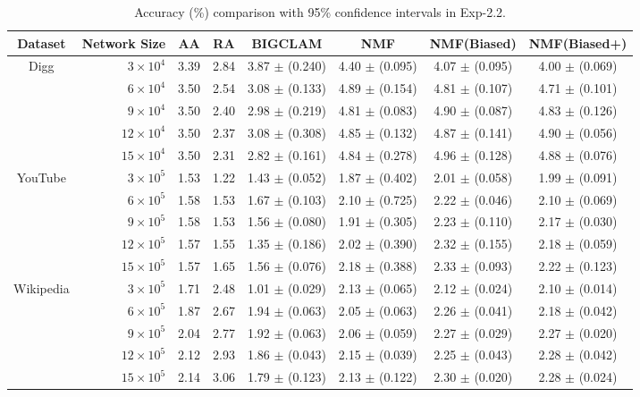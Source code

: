 \documentclass[10pt,journal,compsoc]{IEEEtran}
\newcommand{\NMF}{{\sf NMF}\xspace }
\newcommand{\Biased}{{\sf NMF(Biased)}\xspace}
\newcommand{\Aa}{{\sf AA}\xspace }
\newcommand{\RA}{{\sf RA}\xspace }
\newcommand{\BIGCLAM}{{\sf BIGCLAM}\xspace}
\newcommand{\Digg}{{\sf Digg}\xspace}
\newcommand{\YouTube}{{\sf YouTube}\xspace}
\newcommand{\Wikipedia}{{\sf Wikipedia}\xspace}
\newcommand{\Biasedp}{{\sf NMF(Biased+)}\xspace}
\begin{document}
\begin{table}
\caption{Accuracy (\%) comparison with 95\% confidence intervals in Exp-2.2.}
\label{tab_accuracy_4}
\vspace{-2ex}
\centering
\newcommand{\tabincell}[2]{\begin{tabular}{@{}#1@{}}#2\end{tabular}}
\begin{tabular}{c|r|c|c|c|c|c|c}
\hline \hline Dataset  & Network Size & \Aa & \RA & \BIGCLAM & \NMF & \Biased & \Biasedp  \\
\hline
\multirow{5}{*}{\Digg}
 & $3 \times 10^4 $ & 3.39 & 2.84 & 3.87 $\pm$ (0.240) & 4.40 $\pm$ (0.095) & 4.07 $\pm$ (0.095) & 4.00 $\pm$ (0.069) \\
 & $6 \times 10^4 $ & 3.50 & 2.54 & 3.08 $\pm$ (0.133) & 4.89 $\pm$ (0.154) & 4.81 $\pm$ (0.107) & 4.71 $\pm$ (0.101)  \\
 & $9 \times 10^4 $ & 3.50 & 2.40 & 2.98 $\pm$ (0.219) & 4.81 $\pm$ (0.083) & 4.90 $\pm$ (0.087) & 4.83 $\pm$ (0.126)  \\
 & $12 \times 10^4 $ & 3.50 & 2.37 & 3.08 $\pm$ (0.308) & 4.85 $\pm$ (0.132) & 4.87 $\pm$ (0.141) & 4.90 $\pm$ (0.056) \\
 & $15 \times 10^4 $ & 3.50 & 2.31 & 2.82 $\pm$ (0.161) & 4.84 $\pm$ (0.278) & 4.96 $\pm$ (0.128) & 4.88 $\pm$ (0.076)  \\
\hline
\multirow{5}{*}{\YouTube}
 & $3 \times 10^5 $ & 1.53 & 1.22 & 1.43 $\pm$ (0.052) & 1.87 $\pm$ (0.402) & 2.01 $\pm$ (0.058) & 1.99 $\pm$ (0.091)  \\
 & $6 \times 10^5 $ & 1.58 & 1.53 & 1.67 $\pm$ (0.103) & 2.10 $\pm$ (0.725) & 2.22 $\pm$ (0.046) & 2.10 $\pm$ (0.069)  \\
 & $9 \times 10^5 $ & 1.58 & 1.53 & 1.56 $\pm$ (0.080) & 1.91 $\pm$ (0.305) & 2.23 $\pm$ (0.110) & 2.17 $\pm$ (0.030)  \\
 & $12 \times 10^5 $ & 1.57 & 1.55 & 1.35 $\pm$ (0.186) & 2.02 $\pm$ (0.390) & 2.32 $\pm$ (0.155) & 2.18 $\pm$ (0.059)  \\
 & $15 \times 10^5 $ & 1.57 & 1.65 & 1.56 $\pm$ (0.076) & 2.18 $\pm$ (0.388) & 2.33 $\pm$ (0.093) & 2.22 $\pm$ (0.123)  \\
\hline
\multirow{5}{*}{\Wikipedia}
 & $3 \times 10^5 $ & 1.71 & 2.48 & 1.01 $\pm$ (0.029) & 2.13 $\pm$ (0.065) & 2.12 $\pm$ (0.024) & 2.10 $\pm$ (0.014)  \\
 & $6 \times 10^5 $ & 1.87 & 2.67 & 1.94 $\pm$ (0.063) & 2.05 $\pm$ (0.063) & 2.26 $\pm$ (0.041) & 2.18 $\pm$ (0.042)  \\
 & $9 \times 10^5 $ & 2.04 & 2.77 & 1.92 $\pm$ (0.063) & 2.06 $\pm$ (0.059) & 2.27 $\pm$ (0.029) & 2.27 $\pm$ (0.020)  \\
 & $12 \times 10^5 $ & 2.12 & 2.93 & 1.86 $\pm$ (0.043) & 2.15 $\pm$ (0.039) & 2.25 $\pm$ (0.043) & 2.28 $\pm$ (0.042)  \\
 & $15 \times 10^5 $ & 2.14 & 3.06 & 1.79 $\pm$ (0.123) & 2.13 $\pm$ (0.122) & 2.30 $\pm$ (0.020) & 2.28 $\pm$ (0.024) \\
\hline \hline
\end{tabular}
\vspace{-2ex}
\end{table}
\end{document}
